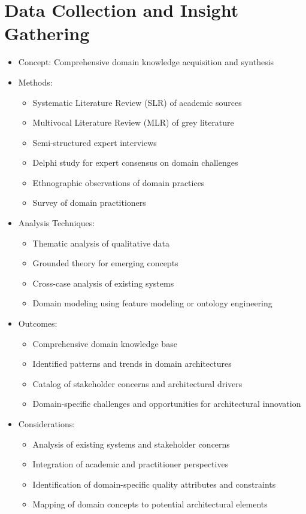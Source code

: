 \documentclass[12pt,a4paper]{article}
\begin{document}
\section{Data Collection and Insight Gathering}
\begin{itemize}
    \item Concept: Comprehensive domain knowledge acquisition and synthesis
    \item Methods:
    \begin{itemize}
        \item Systematic Literature Review (SLR) of academic sources \citep{Kitchenham2007}
        \item Multivocal Literature Review (MLR) of grey literature \citep{Garousi2019}
        \item Semi-structured expert interviews \citep{Bogner2009}
        \item Delphi study for expert consensus on domain challenges \citep{Dalkey1963}
        \item Ethnographic observations of domain practices \citep{Sharp2016}
        \item Survey of domain practitioners \citep{Linaker2015}
    \end{itemize}
    \item Analysis Techniques:
    \begin{itemize}
        \item Thematic analysis of qualitative data \citep{Braun2006}
        \item Grounded theory for emerging concepts \citep{Stol2016}
        \item Cross-case analysis of existing systems \citep{Yin2017}
        \item Domain modeling using feature modeling or ontology engineering \citep{Pohl2005}
    \end{itemize}
    \item Outcomes:
    \begin{itemize}
        \item Comprehensive domain knowledge base
        \item Identified patterns and trends in domain architectures
        \item Catalog of stakeholder concerns and architectural drivers
        \item Domain-specific challenges and opportunities for architectural innovation
    \end{itemize}
    \item Considerations:
    \begin{itemize}
        \item Analysis of existing systems and stakeholder concerns \citep{Nakagawa2023}
        \item Integration of academic and practitioner perspectives
        \item Identification of domain-specific quality attributes and constraints
        \item Mapping of domain concepts to potential architectural elements
    \end{itemize}
\end{itemize}
\end{document}
